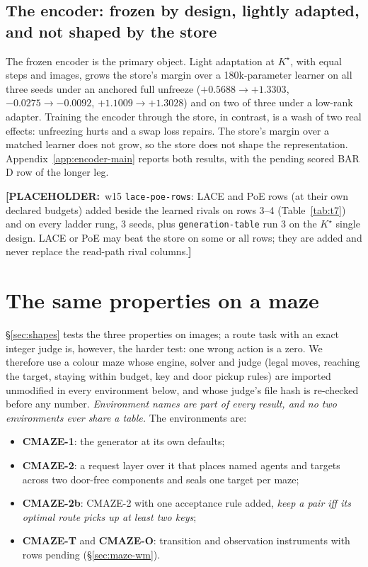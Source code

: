 \documentclass{article} %
\newcommand{\PLACEHOLDER}[1]{{\color{red}\textbf{[PLACEHOLDER:}~#1\textbf{]}}}
\newcommand{\Kstar}{\ensuremath{K^{\star}}}
\begin{document}
\subsection{The encoder: frozen by design, lightly adapted, and not shaped by the store}
\label{sec:adapt}\label{sec:bard}
The frozen encoder is the primary object. Light adaptation at $\Kstar$, with equal steps and
images, grows the store's margin over a 180k-parameter learner on all three seeds under an
anchored full unfreeze ($+0.5688\to+1.3303$, $-0.0275\to-0.0092$, $+1.1009\to+1.3028$) and on two
of three under a low-rank adapter. %
Training the encoder through the store, in contrast, is a wash of two real effects: unfreezing
hurts and a swap loss repairs. The store's margin over a matched learner does not grow, so the
store does not shape the representation. Appendix~\ref{app:encoder-main} reports both results,
with the pending scored BAR D row of the longer leg.

\PLACEHOLDER{w15 \texttt{lace-poe-rows}: LACE and PoE rows (at their own declared budgets) added
beside the learned rivals on rows 3--4 (Table~\ref{tab:t7}) and on every ladder rung, 3 seeds,
plus \texttt{generation-table} run 3 on the $\Kstar$ single design. LACE or PoE may beat the store
on some or all rows; they are added and never replace the read-path rival columns.}

\section{The same properties on a maze}
\label{sec:maze}

\S\ref{sec:shapes} tests the three properties on images; a route task with an exact integer judge is, however, the harder test: one wrong action is a zero. We therefore use a colour maze whose engine, solver and judge (legal
moves, reaching the target, staying within budget, key and door pickup rules) are imported
unmodified in every environment below, and whose judge's file hash is re-checked before any
number. %
\emph{Environment names are part of every result, and no two environments ever share a
table.} The environments are:
\begin{itemize}[leftmargin=*,nosep]
\item \textbf{CMAZE-1}: the generator at its own defaults;
\item \textbf{CMAZE-2}: a request layer over it that places named agents and targets across two
  door-free components and seals one target per maze;
\item \textbf{CMAZE-2b}: CMAZE-2 with one acceptance rule added, \emph{keep a pair iff its
  optimal route picks up at least two keys};
\item \textbf{CMAZE-T} and \textbf{CMAZE-O}: transition and observation instruments with rows pending (\S\ref{sec:maze-wm}).
\end{itemize}
\end{document}
